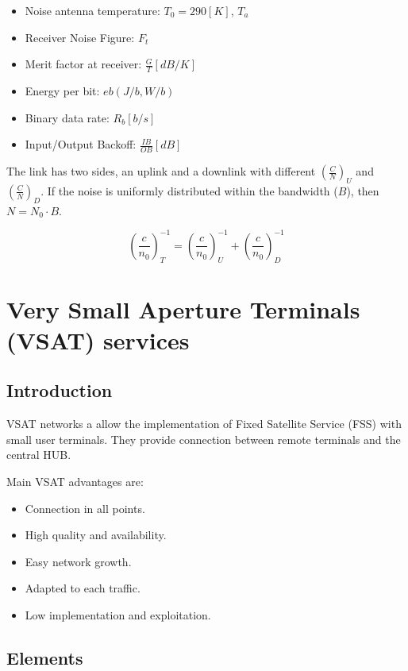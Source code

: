 \documentclass[
	12pt,
	twoside
]{book}
\begin{document}
\begin{itemize}
{\begin{itemize}
{				$T = T_a + T_0 (F_t - 1) [K]$
			}
			\item Noise antenna temperature: $T_0 = 290 [K]$, $T_a$
			\item Receiver Noise Figure: $F_t$
			\item Merit factor at receiver: $\frac {G} {T} [dB/K]$
			\item Energy per bit: $eb (J/b, W/b)$
			\item Binary data rate: $R_b [b/s]$
			\item Input/Output Backoff: $\frac {IB} {OB} [dB]$
		\end{itemize}
	}
\end{itemize}

The link has two sides, an uplink and a downlink with different $\left( \frac {C} {N} \right)_U$ and $\left( \frac {C} {N} \right)_D$. If the noise is uniformly distributed within the bandwidth ($B$), then $N = N_0 \cdot B$.

$$
	\left( \frac {c} {n_0} \right)_{T}^{-1} = \left( \frac {c} {n_0} \right)_{U}^{-1} + \left( \frac {c} {n_0} \right)_{D}^{-1}
$$

\section{Very Small Aperture Terminals (VSAT) services}

\subsection{Introduction}

VSAT networks a allow the implementation of Fixed Satellite Service (FSS) with small user terminals. They provide connection between remote terminals and the central HUB.

Main VSAT advantages are:
\begin{itemize}
	\item Connection in all points.
	\item High quality and availability.
	\item Easy network growth.
	\item Adapted to each traffic.
	\item Low implementation and exploitation.
\end{itemize}

\subsection{Elements}
\end{document}
